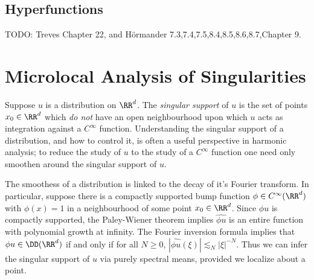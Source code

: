 \section{Hyperfunctions}

TODO: Treves Chapter 22, and H\"{o}rmander 7.3,7.4,7.5,8.4,8.5,8.6,8.7,Chapter 9.







\chapter{Microlocal Analysis of Singularities}

Suppose $u$ is a distribution on $\RR^d$. The \emph{singular support} of $u$ is the set of points $x_0 \in \RR^d$ which \emph{do not} have an open neighbourhood upon which $u$ acts as integration against a $C^\infty$ function. Understanding the singular support of a distribution, and how to control it, is often a useful perspective in harmonic analysis; to reduce the study of $u$ to the study of a $C^\infty$ function one need only smoothen around the singular support of $u$.

The smoothess of a distribution is linked to the decay of it's Fourier transform. In particular, suppose there is a compactly supported bump function $\phi \in C^\infty(\RR^d)$ with $\phi(x) = 1$ in a neighbourhood of some point $x_0 \in \RR^d$. Since $\phi u$ is compactly supported, the Paley-Wiener theorem implies $\widehat{\phi u}$ is an entire function with polynomial growth at infinity. The Fourier inversion formula implies that $\phi u \in \DD(\RR^d)$ if and only if for all $N \geq 0$, $|\widehat{\phi u}(\xi)| \lesssim_N |\xi|^{-N}$. Thus we can infer the singular support of $u$ via purely spectral means, provided we localize about a point.

